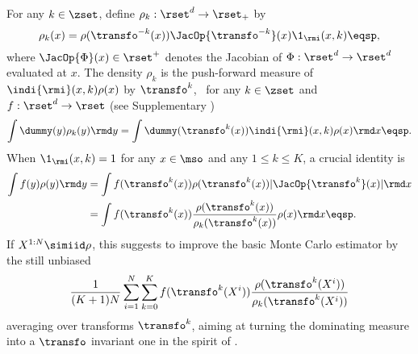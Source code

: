 For any $k \in \zset$, define $\rho_k : \rset^d \to \rset_+$ by
\begin{equation}
\label{eq:definition-rho-k}
    \rho_k(x)= \rho(\transfo^{-k}(x))  
    \JacOp{\transfo^{-k}}(x) \1_{\rmi}(x,k)\eqsp,
\end{equation}
where ${\JacOp{\Phi}(x)}\in\rset^+$ denotes the Jacobian of $\Phi: \rset^d\to \rset^d$ evaluated at $x$.
The density $\rho_k$ is the push-forward
measure of $\indi{\rmi}(x,k)\rho({x})$ by $\transfo^{k}$, \ie~for any $k \in \zset$ and  $f:\rset^d \to \rset$ (see Supplementary )
\begin{equation}
    \label{eq:inf_non_eq_av_0}
    \int \dummy(y)    \rho_k(y)\rmd y =
  \int \dummy(\transfo^{k}(x)) \indi{\rmi}(x,k)\rho(x)\rmd x  \eqsp.
\end{equation}
When $\1_{\rmi}(x,k) = 1$ for any $x \in \mso$ and any $1\le k\le K$, a crucial identity is
\begin{align*}
\int f(y) \rho(y) \rmd y &=
\int f(\transfo^{k}(x)) \rho(\transfo^{k}(x)) |\JacOp{\transfo^{k}}(x)|\rmd x 
\\
&=
\int f(\transfo^{k}(x)) \frac{\rho(\transfo^{k}(x))}{\rho_k(\transfo^{k}(x))} \rho(x) \rmd x \eqsp.
\end{align*}
If $X^{1:N}\simiid\rho$, this suggests to improve the basic Monte Carlo estimator by the still unbiased 
\begin{equation}\label{eq:multimpo}
\frac{1}{(K+1)N}\sum_{i=1}^N\sum_{k=0}^K f(\transfo^{k}(X^i))\frac{\rho(\transfo^{k}(X^i))}{
\rho_k(\transfo^{k}(X^i))}
\end{equation}
averaging over transforms $\transfo^k$, aiming at turning the dominating measure into a $\transfo$ invariant one in the spirit of \cite{kong:etal:2003}.


